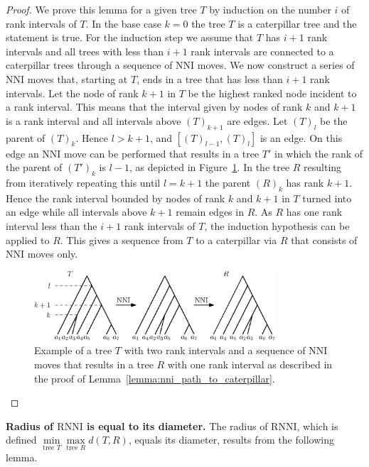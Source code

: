 \documentclass[11pt]{amsart}
\newcommand{\rnni}{\mathrm{RNNI}}
\newcommand{\nni}{\mathrm{NNI}}
\newcommand{\summary}[1]{\textbf{#1}} %
\begin{document}
\begin{proof}
	We prove this lemma for a given tree $T$ by induction on the number $i$ of rank intervals of $T$.
	In the base case $k = 0$ the tree $T$ is a caterpillar tree and the statement is true.
	For the induction step we assume that $T$ has $i+1$ rank intervals and all trees with less than $i+1$ rank intervals are connected to a caterpillar trees through a sequence of $\nni$ moves.
	We now construct a series of $\nni$ moves that, starting at $T$, ends in a tree that has less than $i+1$ rank intervals.
	Let the node of rank $k+1$ in $T$ be the highest ranked node incident to a rank interval.
	This means that the interval given by nodes of rank $k$ and $k+1$ is a rank interval and all intervals above $(T)_{k+1}$ are edges.
	Let $(T)_l$ be the parent of $(T)_k$.
	Hence $l > k+1$, and $[(T)_{l-1}, (T)_{l}]$ is an edge.
	On this edge an $\nni$ move can be performed that results in a tree $T'$ in which the rank of the parent of $(T')_k$ is $l-1$, as depicted in Figure~\ref{fig:nni_path_caterpillar}.
	In the tree $R$ resulting from iteratively repeating this until $l = k+1$ the parent $(R)_k$ has rank $k+1$.
	Hence the rank interval bounded by nodes of rank $k$ and $k+1$ in $T$ turned into an edge while all intervals above $k+1$ remain edges in $R$.
	As $R$ has one rank interval less than the $i+1$ rank intervals of $T$, the induction hypothesis can be applied to $R$.
	This gives a sequence from $T$ to a caterpillar via $R$ that consists of $\nni$ moves only.
	\begin{figure}[ht]
		\includegraphics[width=0.8\textwidth]{nni_path_caterpillar.eps}
		\caption{Example of a tree $T$ with two rank intervals and a sequence of $\nni$ moves that results in a tree $R$ with one rank interval as described in the proof of Lemma~\ref{lemma:nni_path_to_caterpillar}.}
		\label{fig:nni_path_caterpillar}
	\end{figure}
\end{proof}

\summary{Radius of $\rnni$ is equal to its diameter.}
The radius of $\rnni$, which is defined $\min\limits_{\text{tree } T}\max\limits_{\text{tree }R} d(T,R)$, equals its diameter, results from the following lemma.
\end{document}
